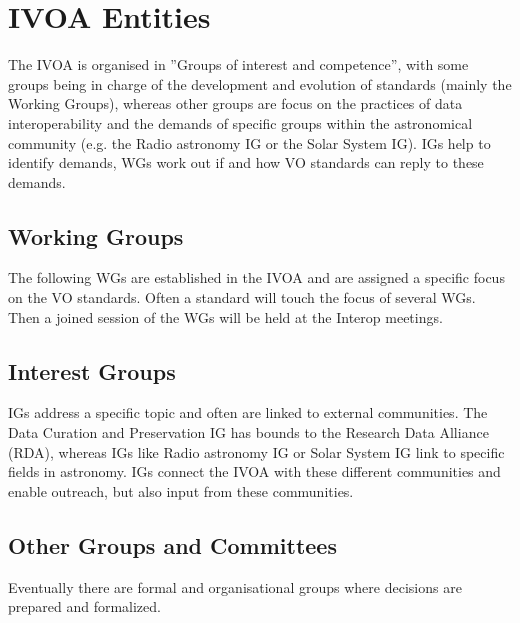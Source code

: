 \documentclass[twoside]{article}[12pt]
\begin{document}
\section{IVOA Entities}

The IVOA is organised in ''Groups of interest and competence'', with
some groups being in charge of the development and evolution of
standards (mainly the Working Groups), whereas other groups are focus on
the practices of data interoperability and the demands of specific
groups within the astronomical community (e.g. the Radio astronomy IG or
the Solar System IG). IGs help to identify demands, WGs work out if and how VO
standards can reply to these demands. 

\subsection*{Working Groups}
The following WGs are established in the IVOA and are assigned a
specific focus on the VO standards. Often a standard will touch the
focus of several WGs. Then a joined session of the WGs will be held at
the Interop meetings. 

\APPS 
\DAL
\DATAMODEL
\GWS
\REGISTRY 
\SEMANTICS

\subsection*{Interest Groups}
IGs address a specific topic and often are linked to external
communities. The Data Curation and Preservation IG has bounds to the
Research Data Alliance (RDA), whereas IGs like Radio astronomy IG or
Solar System IG link to specific fields in astronomy. IGs connect the
IVOA with these different communities and enable outreach, but also
input from these communities. 

\DCP
\EDU
\KDD
\OPERATIONS
\RADIO
\SOLAR
\THEORY
\TIMEDOMAIN


\subsection*{Other Groups and Committees}
Eventually there are formal and organisational groups where decisions
are prepared and formalized. 

\EXEC
\TCG
\CSP
\SCSP


 
\end{document}
